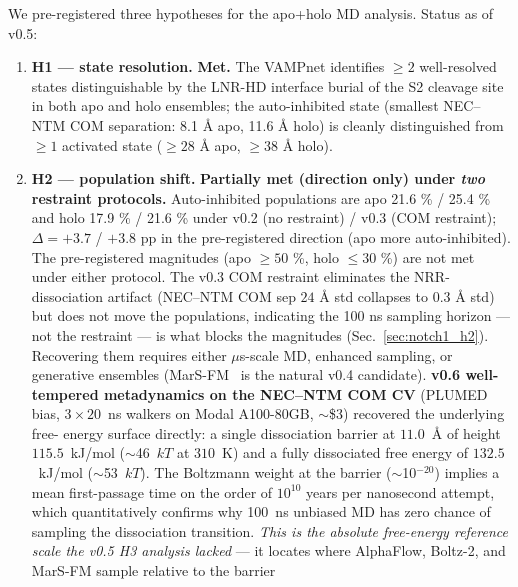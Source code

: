\documentclass[11pt]{article}
\begin{document}
We pre-registered three hypotheses for the apo+holo MD analysis.
Status as of v0.5:

\begin{enumerate}[leftmargin=*,itemsep=2pt]
  \item \textbf{H1 --- state resolution.} \textbf{Met.} The VAMPnet
        identifies $\ge 2$ well-resolved states distinguishable by
        the LNR-HD interface burial of the S2 cleavage site in both
        apo and holo ensembles; the auto-inhibited state (smallest
        NEC--NTM COM separation: 8.1 \AA{} apo, 11.6 \AA{} holo) is
        cleanly distinguished from $\ge 1$ activated state
        ($\ge 28$ \AA{} apo, $\ge 38$ \AA{} holo).
  \item \textbf{H2 --- population shift.} \textbf{Partially met
        (direction only) under \emph{two} restraint protocols.}
        Auto-inhibited populations are apo 21.6 \% / 25.4 \% and
        holo 17.9 \% / 21.6 \% under v0.2 (no restraint) / v0.3
        (COM restraint); $\Delta = +3.7$ / $+3.8$ pp in the
        pre-registered direction (apo more auto-inhibited). The
        pre-registered magnitudes (apo $\ge 50$ \%, holo $\le 30$ \%)
        are not met under either protocol. The v0.3 COM restraint
        eliminates the NRR-dissociation artifact (NEC--NTM COM sep
        $24$ \AA{} std collapses to $0.3$ \AA{} std) but does not
        move the populations, indicating the 100 ns sampling horizon
        --- not the restraint --- is what blocks the magnitudes
        (Sec.~\ref{sec:notch1_h2}). Recovering them requires either
        $\mu$s-scale MD, enhanced sampling, or generative ensembles
        (MarS-FM~\cite{kapusniak2025marsfm} is the natural v0.4
        candidate). \textbf{v0.6 well-tempered metadynamics on the
        NEC--NTM COM CV} (PLUMED bias, $3 \times 20$~ns walkers on
        Modal A100-80GB, $\sim$\$3) recovered the underlying free-
        energy surface directly: a single dissociation barrier at
        $11.0$~\AA{} of height $115.5$~kJ/mol ($\sim$46~$kT$ at
        $310$~K) and a fully dissociated free energy of
        $132.5$~kJ/mol ($\sim$53~$kT$). The Boltzmann weight at
        the barrier ($\sim$10$^{-20}$) implies a mean first-passage
        time on the order of $10^{10}$ years per nanosecond
        attempt, which quantitatively confirms why 100~ns unbiased
        MD has zero chance of sampling the dissociation transition.
        \emph{This is the absolute free-energy reference scale the
        v0.5 H3 analysis lacked} --- it locates where AlphaFlow,
        Boltz-2, and MarS-FM sample relative to the barrier

\end{enumerate}
\end{document}
